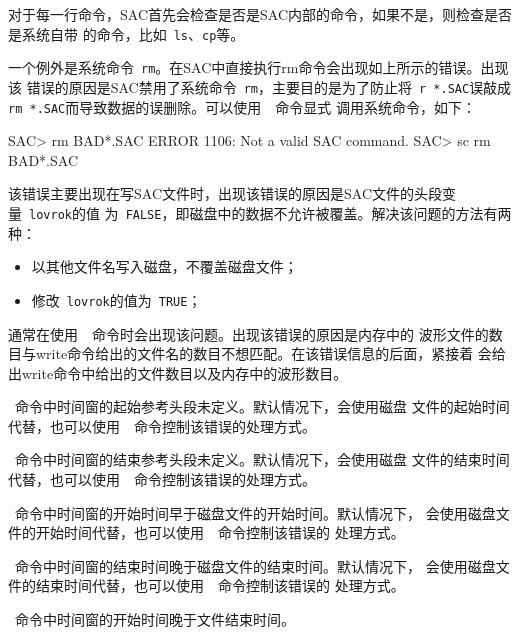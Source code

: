 对于每一行命令，SAC首先会检查是否是SAC内部的命令，如果不是，则检查是否是系统自带
的命令，比如~\verb+ls+、\verb+cp+等。

一个例外是系统命令~\verb+rm+。在SAC中直接执行rm命令会出现如上所示的错误。出现该
错误的原因是SAC禁用了系统命令~\verb+rm+，主要目的是为了防止将~\verb+r *.SAC+误敲成
\verb+rm *.SAC+而导致数据的误删除。可以使用~~命令显式
调用系统命令，如下：
\begin{SACCode}
SAC> rm BAD*.SAC
 ERROR 1106: Not a valid SAC command.
SAC> sc rm BAD*.SAC
\end{SACCode}

该错误主要出现在写SAC文件时，出现该错误的原因是SAC文件的头段变量~\verb+lovrok+的值
为~\verb+FALSE+，即磁盘中的数据不允许被覆盖。解决该问题的方法有两种：
\begin{itemize}
\item 以其他文件名写入磁盘，不覆盖磁盘文件；
\item 修改~\verb+lovrok+的值为~\verb+TRUE+；
\end{itemize}

通常在使用~~命令时会出现该问题。出现该错误的原因是内存中的
波形文件的数目与write命令给出的文件名的数目不想匹配。在该错误信息的后面，紧接着
会给出write命令中给出的文件数目以及内存中的波形数目。

~命令中时间窗的起始参考头段未定义。默认情况下，会使用磁盘
文件的起始时间代替，也可以使用~~命令控制该错误的处理方式。

~命令中时间窗的结束参考头段未定义。默认情况下，会使用磁盘
文件的结束时间代替，也可以使用~~命令控制该错误的处理方式。

~命令中时间窗的开始时间早于磁盘文件的开始时间。默认情况下，
会使用磁盘文件的开始时间代替，也可以使用~~命令控制该错误的
处理方式。

~命令中时间窗的结束时间晚于磁盘文件的结束时间。默认情况下，
会使用磁盘文件的结束时间代替，也可以使用~~命令控制该错误的
处理方式。

~命令中时间窗的开始时间晚于文件结束时间。
